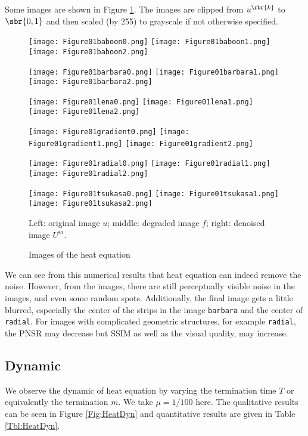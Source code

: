 \documentclass[english, nochinese]{pnote}
\begin{document}
Some images are shown in Figure \ref{Fig:Heat}. The images are clipped from $u^{\rbr{k}}$ to $ \sbr{ 0, 1 } $ and then scaled (by 255) to grayscale if not otherwise specified.

\begin{figure}[htb]
{
\centering

\texttt{[image: Figure01baboon0.png]}
\texttt{[image: Figure01baboon1.png]}
\texttt{[image: Figure01baboon2.png]}

\texttt{[image: Figure01barbara0.png]}
\texttt{[image: Figure01barbara1.png]}
\texttt{[image: Figure01barbara2.png]}

\texttt{[image: Figure01lena0.png]}
\texttt{[image: Figure01lena1.png]}
\texttt{[image: Figure01lena2.png]}

\texttt{[image: Figure01gradient0.png]}
\texttt{[image: Figure01gradient1.png]}
\texttt{[image: Figure01gradient2.png]}

\texttt{[image: Figure01radial0.png]}
\texttt{[image: Figure01radial1.png]}
\texttt{[image: Figure01radial2.png]}

\texttt{[image: Figure01tsukasa0.png]}
\texttt{[image: Figure01tsukasa1.png]}
\texttt{[image: Figure01tsukasa2.png]}

\caption{Images of the heat equation}
\label{Fig:Heat}
}
{
\footnotesize Left: original image $u$; middle: degraded image $f$; right: denoised image $U^m$.
}
\end{figure}

We can see from this numerical results that heat equation can indeed remove the noise. However, from the images, there are still perceptually visible noise in the images, and even some random spots. Additionally, the final image gets a little blurred, especially the center of the strips in the image \verb"barbara" and the center of \verb"radial". For images with complicated geometric structures, for example \verb"radial", the PNSR may decrease but SSIM as well as the visual quality, may increase.

\subsection{Dynamic}

We observe the dynamic of heat equation by varying the termination time $T$ or equivalently the termination $m$. We take $ \mu = 1 / 100 $ here. The qualitative results can be seen in Figure \ref{Fig:HeatDyn} and quantitative results are given in Table \ref{Tbl:HeatDyn}.
\end{document}

